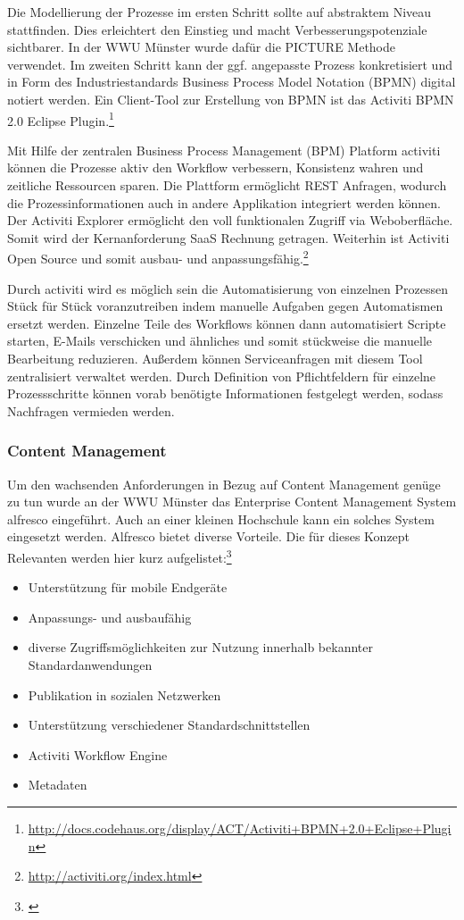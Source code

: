 Die Modellierung der Prozesse im ersten Schritt sollte auf abstraktem Niveau stattfinden. Dies erleichtert den Einstieg und macht Verbesserungspotenziale sichtbarer. In der WWU Münster wurde dafür die PICTURE Methode verwendet.
Im zweiten Schritt kann der ggf. angepasste Prozess konkretisiert und in Form des Industriestandards Business Process Model Notation (BPMN) digital notiert werden. Ein Client-Tool zur Erstellung von BPMN ist das Activiti BPMN 2.0 Eclipse Plugin.\footnote{\url{http://docs.codehaus.org/display/ACT/Activiti+BPMN+2.0+Eclipse+Plugin}}

Mit Hilfe der zentralen Business Process Management (BPM) Platform activiti können die Prozesse aktiv den Workflow verbessern, Konsistenz wahren und zeitliche Ressourcen sparen.  Die Plattform ermöglicht REST Anfragen, wodurch die Prozessinformationen auch in andere Applikation integriert werden können. Der Activiti Explorer ermöglicht den voll funktionalen Zugriff via Weboberfläche. Somit wird der Kernanforderung SaaS Rechnung getragen. Weiterhin ist Activiti Open Source und somit ausbau- und anpassungsfähig.\footnote{\url{http://activiti.org/index.html}}

Durch activiti wird es möglich sein die Automatisierung von einzelnen Prozessen Stück für Stück voranzutreiben indem manuelle Aufgaben gegen Automatismen ersetzt werden. Einzelne Teile des Workflows können dann automatisiert Scripte starten, E-Mails verschicken und ähnliches und somit stückweise die manuelle Bearbeitung reduzieren. Außerdem können Serviceanfragen mit diesem Tool zentralisiert verwaltet werden. Durch Definition von Pflichtfeldern für einzelne Prozessschritte können vorab benötigte Informationen festgelegt werden, sodass Nachfragen vermieden werden.

\subsubsection{Content Management}
Um den wachsenden Anforderungen in Bezug auf Content Management genüge zu tun wurde an der WWU Münster das Enterprise Content Management System alfresco eingeführt. Auch an einer kleinen Hochschule kann ein solches System eingesetzt werden. Alfresco bietet diverse Vorteile. Die für dieses Konzept Relevanten werden hier kurz aufgelistet:\footnote{\cite{kloetgen_2012}}

\begin{itemize}
	\item Unterstützung für mobile Endgeräte
	\item Anpassungs- und ausbaufähig
	\item diverse Zugriffsmöglichkeiten zur Nutzung innerhalb bekannter Standardanwendungen
	\item Publikation in sozialen Netzwerken
	\item Unterstützung verschiedener Standardschnittstellen
	\item Activiti Workflow Engine
	\item Metadaten
\end{itemize}

